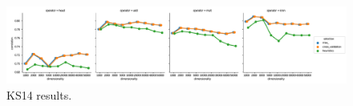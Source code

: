 \begin{figure}[b]
  \centering

    \includegraphics[width=\textwidth]{supplement/figures/ks14-results}
  \caption{KS14 results.}
  \label{fig:ks14-results}
\end{figure}

